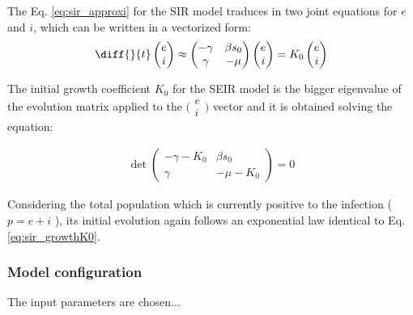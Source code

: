 \documentclass[DIV=12, BCOR=0pt]{scrartcl}  %
\begin{document}
  The Eq. \ref{eq:sir_approxi} for the SIR model traduces in two joint equations for $e$ and $i$, which can be written in a vectorized form:
  \begin{align}
  	\diff{}{t}
  	\begin{pmatrix}
  			e \\
  			i
  	\end{pmatrix}
  	\approx 
  	\begin{pmatrix}
  		 - \gamma & \beta s_0\\
  		 \gamma & - \mu
  	\end{pmatrix}
  	\begin{pmatrix}
  		e \\
  		i
  	\end{pmatrix}
	  = K_0
	  \begin{pmatrix}
	  	e \\
	  	i
	  \end{pmatrix} %
		\label{eq:seir_approxi}
	\end{align}

The initial growth coefficient $K_0$ for the SEIR model is the bigger eigenvalue of the evolution matrix applied to the $\big( \begin{smallmatrix} e \\	i \end{smallmatrix}\big)$ vector and it is obtained solving the equation: 

	\begin{align}
		\det 
		\begin{pmatrix}
			- \gamma - K_0 & \beta s_0\\
			\gamma & - \mu - K_0
		\end{pmatrix} = 0
	\label{eq:seir_K0}
	\end{align}
 
 Considering the total population which is currently positive to the infection ( $p = e + i$ ), its initial evolution again follows an exponential law identical to Eq. \ref{eq:sir_growthK0}.
	
  \subsubsection{Model configuration}
  The input parameters are chosen... %
  
\end{document}
